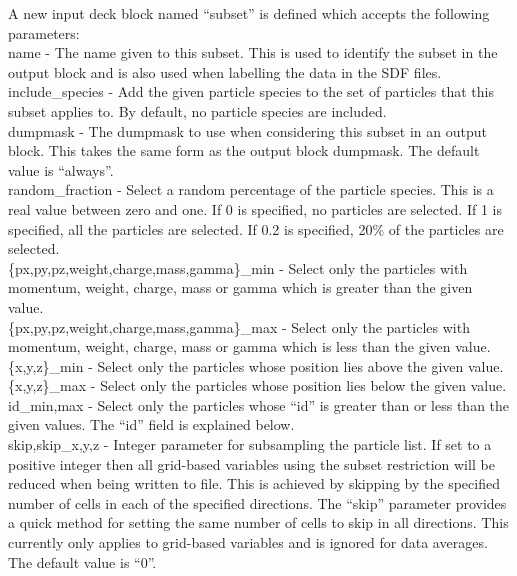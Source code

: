 A new input deck block named ``subset'' is defined which accepts the following
parameters:\\

{\emphtext name} - The name given to this subset. This is used to identify the
  subset in the output block and is also used when labelling the data in the
  SDF files.\\

{\emphtext include\_species} - Add the given particle species to the set of
  particles that this subset applies to. By default, no particle species
  are included.\\

{\emphtext dumpmask} - The dumpmask to use when considering this subset in
  an output block. This takes the same form as the output block dumpmask.
  The default value is ``always''.\\

{\emphtext random\_fraction} - Select a random percentage of the particle
  species. This is a real value between zero and one. If 0 is specified,
  no particles are selected. If 1 is specified, all the particles are
  selected. If 0.2 is specified, 20\% of the particles are selected.\\

{\emphtext \{px,py,pz,weight,charge,mass,gamma\}\_min} - Select only the
  particles with momentum, weight, charge, mass or gamma which is greater
  than the given value.\\

{\emphtext \{px,py,pz,weight,charge,mass,gamma\}\_max} - Select only the
  particles with momentum, weight, charge, mass or gamma which is less
  than the given value.\\

{\emphtext \{x,y,z\}\_min} - Select only the particles whose position lies
  above the given value.\\

{\emphtext \{x,y,z\}\_max} - Select only the particles whose position lies
  below the given value.\\

{\emphtext id\_{min,max}} - Select only the particles whose ``id'' is greater
  than or less than the given values. The ``id'' field is explained below.\\

{\emphtext skip,skip\_{x,y,z}} - Integer parameter for subsampling the particle
  list. If set to a positive integer then all grid-based variables using the
  subset restriction will be reduced when being written to file. This is
  achieved by skipping by the specified number of cells in each of the
  specified directions. The ``skip'' parameter provides a quick method for
  setting the same number of cells to skip in all directions.
  This currently only applies to grid-based variables and is ignored for
  data averages. The default value is ``0''.

